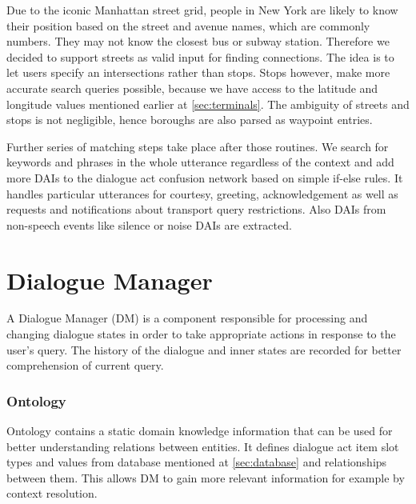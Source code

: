 Due to the iconic Manhattan street grid, people in New York are likely to know their position based on the street and avenue names, which are commonly numbers.
They may not know the closest bus or subway station.
Therefore we decided to support streets as valid input for finding connections.
The idea is to let users specify an intersections rather than stops. Stops however, make more accurate search queries possible, because we have access to the latitude and longitude values mentioned earlier at \ref{sec:terminals}.
The ambiguity of streets and stops is not negligible, hence boroughs are also parsed as waypoint entries.

Further series of matching steps take place after those routines.
We search for keywords and phrases in the whole utterance regardless of the context and add more DAIs to the dialogue act confusion network based on simple if-else rules.
It handles particular utterances for courtesy, greeting, acknowledgement as well as requests and notifications about transport query restrictions.
Also DAIs from non-speech events like silence or noise DAIs are extracted.

\section{Dialogue Manager}

A Dialogue Manager (DM) is a component responsible for processing and changing dialogue states in order to take appropriate actions in response to the user's query.
The history of the dialogue and inner states are recorded for better comprehension of current query.

\subsubsection{Ontology}

Ontology contains a static domain knowledge information that can be used for better understanding relations between entities.
It defines dialogue act item slot types and values from database mentioned at \ref{sec:database} and relationships between them.
This allows DM to gain more relevant information for example by context resolution.

